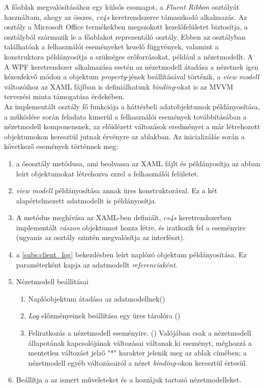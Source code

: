 A főablak megvalósításához egy külsős csomagot, a \emph{Fluent Ribbon}  osztályát használtam, ahogy az összes, \emph{cv4s} keretrendszerre támaszkodó alkalmazás. Az osztály a Microsoft Office termékekben megszokott kezelőfelületet biztosítja, a  osztályból származik le a főablakot reprezentáló osztály. Ebben az osztályban találhatóak a felhasználói eseményeket kezelő függvények, valamint a konstruktora példányosítja a szükséges erőforrásokat, például a nézetmodellt. A A WPF keretrendszer alkalmazása esetén az nézetmodell átadása a nézetnek igen kézenfekvő módon a  objektum  \emph{property}-jének beállításával történik, a \emph{view modell} változóihoz az XAML fájlban is definiálhatunk \emph{binding}-okat is az MVVM tervezési minta támogatása érdekében.\\
Az implementált osztály fő funkciója a háttérbeli adatobjektumok példányosítása, a működése során feladata kimerül a felhasználói események továbbításában a nézetmodell komponensnek, az előidézett változások eredményei a már létrehozott  objektumokon keresztül jutnak érvényre az ablakban. Az inicializálás során a következő események történnek meg:
\begin{enumerate}
\item {} a  ősosztály metódusa, ami beolvassa az XAML fájlt és példányosítja az abban leírt objektumokat létrehozva ezzel a felhasználói felületet.
\item \emph{view modell} példányosítása annak üres konstruktorával. Ez a két alapértelmezett adatmodellt is példányosítja.
\item A  metódus meghívása az XAML-ben definiált, \emph{cv4s} keretrendszerben implementált  \textit{vászon} objektumot hozza létre, és iratkozik fel a  eseményire (ugyanis az osztály szintén megvalósítja az  interfészt).
\item a \ref{subs:client_log} bekezdésben leírt naplózó objektum példányosítása. Ez paraméterként kapja az adatmodellt \emph{referenciaként}.
\item Nézetmodell beállításai
    \begin{enumerate}
   	\item Naplóobjektum átadása az adatmodellnek()
    \item \emph{Log} előzményeinek beállítása egy üres tárolóra ()
    \item Feliratkozás a nézetmodell eseményire. () Valójában csak a nézetmodell állapotának  kapcsolójának változásai váltanak ki eseményt, méghozzá a mentetlen változást jelző "*" karakter jelenik meg az ablak címében; a nézetmodell egyéb változásairól a nézet \emph{binding}-okon keresztül értesül.
    \end{enumerate}
\item {} Beállítja a az ismert műveleteket és a hozzájuk tartozó nézetmodelleket.
\end{enumerate}

